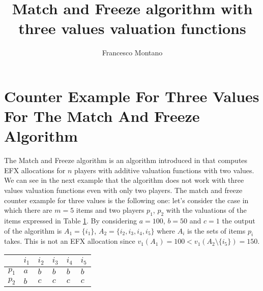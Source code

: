 \documentclass{article}
\title{Match and Freeze algorithm with three values valuation functions}
\author{Francesco Montano}
\begin{document}
\maketitle

\section{Counter Example For Three Values For The Match And Freeze Algorithm}
The Match and Freeze algorithm is an algorithm introduced in \cite{DBLP:journals/corr/abs-2001-09838} that computes EFX allocations for $n$ players with additive valuation functions with two values. We can see in the next example that the algorithm does not work with three values valuation functions even with only two players. The match and freeze counter example for three values is the following one: let's consider the case in which there are $m=5$ items and two players $p_1$, $p_2$ with the valuations of the items expressed in Table \ref{table:counter-example-match-and-freeze-three-values}. By considering $a = 100$, $b=50$ and $c=1$ the output of the algorithm is $A_1 = \{i_1\}$, $A_2 = \{i_2,i_3, i_4,i_5\}$ where $A_i$ is the sets of items $p_i$ takes. This is not an EFX allocation since $v_1(A_1) = 100 < v_1(A_2\setminus \{i_{5}\}) = 150$. 


\begin{table}[h]
\centering
\begin{tabular}{|l|l|l|l|l|l|}
\hline
      & $i_1$ & $i_2$ & $i_3$ & $i_4$ & $i_5$ \\ \hline
$p_1$ & $a$   & $b$   & $b$   & $b$   & $b$   \\ \hline
$p_2$ & $b$   & $c$   & $c$   & $c$   & $c$   \\ \hline
\end{tabular}
\label{table:counter-example-match-and-freeze-three-values}
\end{table}
\end{document}
